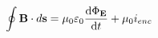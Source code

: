 \documentclass[preview]{standalone}
\begin{document}
\begin{align*}
\oint \mathbf{B} \cdot d\mathbf{s} = \mu_{0}\varepsilon_{0}\dv{\Phi_{\mathbf{E}}}{t} + \mu_{0}i_{enc}
\end{align*}
\end{document}

